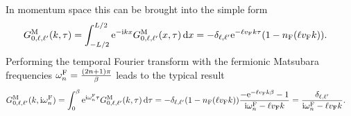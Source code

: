\documentclass[english, parskip=full]{scrartcl}
\begin{document}
In momentum space this can be brought into the simple form
\begin{align}
G_{0,\ell,\ell'}^\M(k,\tau) &= \intx{-L/2}{L/2}{\powe{-\i kx} G_{0,\ell,\ell'}^\M(x,\tau)}{x} = -\delta_{\ell,\ell'} \powe{-\ell\vf k\tau} \kla*{1 - n_\F(\ell\vf k)}.
\end{align}
Performing the temporal Fourier transform with the fermionic Matsubara frequencies $\omega_n^{\text{F}} = \frac{(2n+1)\pi}{\beta}$ leads to the typical result
\begin{align}
G_{0,\ell,\ell'}^\M(k,\i\omega_n^\F) &= \intx{0}{\beta}{\powe{\i\omega_n^\F\tau}G_{0,\ell,\ell'}^\M(k,\tau) }{\tau} = -\delta_{\ell,\ell'} \kla*{1 - n_\F(\ell\vf k)} \frac{-\powe{-\ell\vf k\beta} - 1}{\i\omega_n^\F - \ell\vf k} = \frac{\delta_{\ell,\ell'}}{\i\omega_n^\F - \ell\vf k}.
\end{align}
\end{document}
